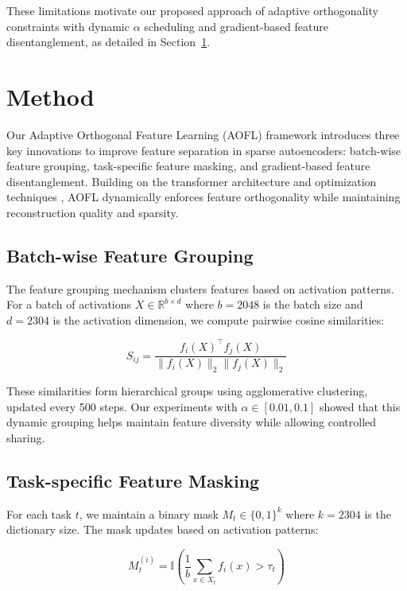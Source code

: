 \documentclass{article} %
\begin{document}
These limitations motivate our proposed approach of adaptive orthogonality constraints with dynamic $\alpha$ scheduling and gradient-based feature disentanglement, as detailed in Section~\ref{sec:method}.

\section{Method}
\label{sec:method}

Our Adaptive Orthogonal Feature Learning (AOFL) framework introduces three key innovations to improve feature separation in sparse autoencoders: batch-wise feature grouping, task-specific feature masking, and gradient-based feature disentanglement. Building on the transformer architecture \cite{vaswani2017attention} and optimization techniques \cite{kingma2014adam}, AOFL dynamically enforces feature orthogonality while maintaining reconstruction quality and sparsity.

\subsection{Batch-wise Feature Grouping}
The feature grouping mechanism clusters features based on activation patterns. For a batch of activations $X \in \mathbb{R}^{b \times d}$ where $b=2048$ is the batch size and $d=2304$ is the activation dimension, we compute pairwise cosine similarities:

\begin{equation}
    S_{ij} = \frac{f_i(X)^\top f_j(X)}{\|f_i(X)\|_2 \|f_j(X)\|_2}
\end{equation}

These similarities form hierarchical groups using agglomerative clustering, updated every 500 steps. Our experiments with $\alpha \in [0.01, 0.1]$ showed that this dynamic grouping helps maintain feature diversity while allowing controlled sharing.

\subsection{Task-specific Feature Masking}
For each task $t$, we maintain a binary mask $M_t \in \{0,1\}^k$ where $k=2304$ is the dictionary size. The mask updates based on activation patterns:

\begin{equation}
    M_t^{(i)} = \mathbb{I}\left(\frac{1}{b}\sum_{x \in X_t} f_i(x) > \tau_t\right)
\end{equation}
\end{document}

